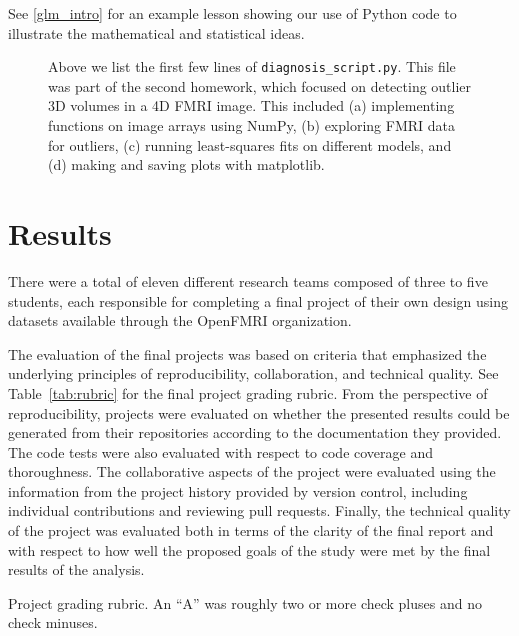 \begin{itemize}
See \cref{glm_intro} for an example lesson showing our use of Python code to
illustrate the mathematical and statistical ideas.

\begin{figure}
\centering

\caption{Above we list the first few lines of \texttt{diagnosis\_script.py}.
This file was part of the second homework, which focused on detecting outlier
3D volumes in a 4D FMRI image.
This included
(a) implementing functions on image arrays using NumPy,
(b) exploring FMRI data for outliers,
(c) running least-squares fits on different models, and
(d) making and saving plots with matplotlib.}\label{fig:diagnosis_script}
\end{figure}


\end{itemize}

\section{Results}\label{results}

There were a total of eleven different research teams composed of three
to five students, each responsible for completing a final project of their
own design using datasets available through the OpenFMRI organization.

The evaluation of the final projects was based on criteria that emphasized the
underlying principles of reproducibility, collaboration, and technical
quality.
See Table~\ref{tab:rubric} for the final project grading rubric.
From the perspective of reproducibility, projects were evaluated on whether the
presented results could be generated from their repositories according to the
documentation they provided.
The code tests were also evaluated with respect to code coverage
and thoroughness.
The collaborative aspects of the project were evaluated using the information
from the project history provided by version control, including
individual contributions and reviewing pull requests.
Finally, the technical quality of the project was evaluated both in terms of
the clarity of the final report and with respect to how well the proposed
goals of the study were met by the final results of the analysis.

\begin{table}
\centering
\begin{tiny}

\caption{Project grading rubric.
An ``A'' was roughly two or more check pluses and no check minuses.}
\label{tab:rubric}
\end{tiny}
\end{table}

